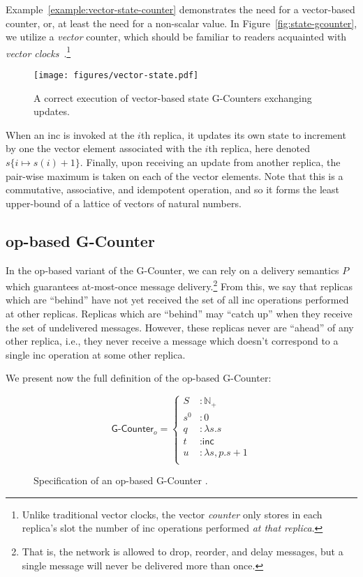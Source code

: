 Example~\ref{example:vector-state-counter} demonstrates the need for a
vector-based counter, or, at least the need for a non-scalar value. In
Figure~\ref{fig:state-gcounter}, we utilize a \emph{vector} counter, which
should be familiar to readers acquainted with \emph{vector
clocks}~\citep{lamport78}.\footnote{Unlike traditional vector clocks, the vector
\emph{counter} only stores in each replica's slot the number of \textsf{inc}
operations performed \emph{at that replica}.}

\begin{figure}[H]
  \centering
  \texttt{[image: figures/vector-state.pdf]}
    \caption{A correct execution of vector-based state G-Counters exchanging
      updates.}
\end{figure}

When an \textsf{inc} is invoked at the $i$th replica, it updates its own state
to increment by one the vector element associated with the $i$th replica, here
denoted $s\{i \mapsto s(i) + 1\}$. Finally, upon receiving an update from
another replica, the pair-wise maximum is taken on each of the vector elements.
Note that this is a commutative, associative, and idempotent operation, and so
it forms the least upper-bound of a lattice of vectors of natural numbers.

\subsection{op-based G-Counter}

In the op-based variant of the G-Counter, we can
rely on a delivery semantics $P$ which guarantees at-most-once message
delivery.\footnote{That is, the network is allowed to drop, reorder, and delay
messages, but a single message will never be delivered more than once.} From
this, we say that replicas which are ``behind'' have not yet received the set of
all \textsf{inc} operations performed at other replicas. Replicas which are
``behind'' may ``catch up'' when they receive the set of undelivered messages.
However, these replicas never are ``ahead'' of any other replica, i.e., they
never receive a message which doesn't correspond to a single \textsf{inc}
operation at some other replica.

We present now the full definition of the op-based G-Counter:

\begin{figure}[H]
  \centering
  \[
    \textsf{G-Counter}_o = \left\{\begin{aligned}
      S &: \mathbb{N}_+ \\
      s^0 &: 0 \\
      q &: \lambda s. s \\
      t &: \textsf{inc} \\
      u &: \lambda s,p. s + 1 \\
    \end{aligned}\right.
  \]
  \caption{Specification of an op-based \textsf{G-Counter} \CRDT.}
\end{figure}

